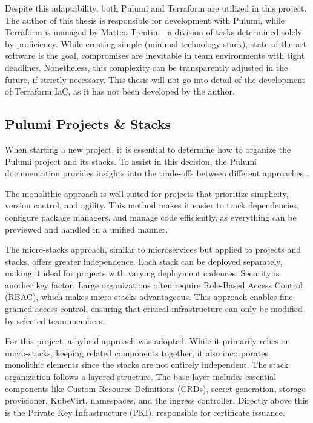 Despite this adaptability, both Pulumi and Terraform are utilized in this project. The author of this thesis is responsible for development with Pulumi, while Terraform is managed by Matteo Trentin -- a division of tasks determined solely by proficiency. While creating simple (minimal technology stack), state-of-the-art software is the goal, compromises are inevitable in team environments with tight deadlines. Nonetheless, this complexity can be transparently adjusted in the future, if strictly necessary. This thesis will not go into detail of the development of Terraform IaC, as it has not been developed by the author.

\subsection{Pulumi Projects \& Stacks}
When starting a new project, it is essential to determine how to organize the Pulumi project and its stacks. To assist in this decision, the Pulumi documentation provides insights into the trade-offs between different approaches \Parencite{pulumiProjects2025}.

The monolithic approach is well-suited for projects that prioritize simplicity, version control, and agility. This method makes it easier to track dependencies, configure package managers, and manage code efficiently, as everything can be previewed and handled in a unified manner.

The micro-stacks approach, similar to microservices but applied to projects and stacks, offers greater independence. Each stack can be deployed separately, making it ideal for projects with varying deployment cadences. Security is another key factor. Large organizations often require Role-Based Access Control (RBAC), which makes micro-stacks advantageous. This approach enables fine-grained access control, ensuring that critical infrastructure can only be modified by selected team members.

For this project, a hybrid approach was adopted. While it primarily relies on micro-stacks, keeping related components together, it also incorporates monolithic elements since the stacks are not entirely independent. The stack organization follows a layered structure. The base layer includes essential components like Custom Resource Definitions (CRDs), secret generation, storage provisioner, KubeVirt, namespaces, and the ingress controller. Directly above this is the Private Key Infrastructure (PKI), responsible for certificate issuance. 

